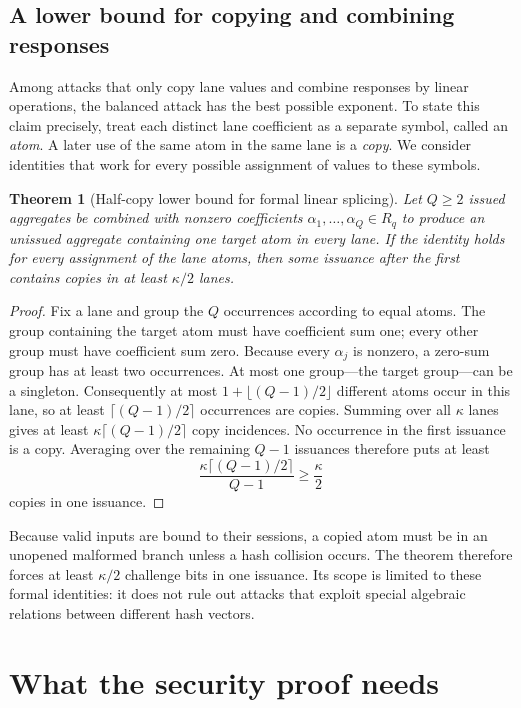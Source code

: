 \documentclass[10pt]{article}
\newtheorem{theorem}{Theorem}
\begin{document}
\subsection{A lower bound for copying and combining responses}

Among attacks that only copy lane values and combine responses by linear
operations, the balanced attack has the best possible exponent.  To state
this claim precisely, treat each distinct lane coefficient as a separate
symbol, called an \emph{atom}.  A later use of the same atom in the same
lane is a \emph{copy}.  We consider identities that work for every possible
assignment of values to these symbols.

\begin{theorem}[Half-copy lower bound for formal linear splicing]
Let $Q\geq2$ issued aggregates be combined with nonzero coefficients
$\alpha_1,\ldots,\alpha_Q\in R_q$ to produce an unissued aggregate containing
one target atom in every lane.  If the identity holds for every assignment of
the lane atoms, then some issuance after the first contains copies in at least
$\kappa/2$ lanes.
\end{theorem}

\begin{proof}
Fix a lane and group the $Q$ occurrences according to equal atoms.  The group
containing the target atom must have coefficient sum one; every other group
must have coefficient sum zero.  Because every $\alpha_j$ is nonzero, a
zero-sum group has at least two occurrences.  At most one group---the target
group---can be a singleton.  Consequently at most
$1+\lfloor(Q-1)/2\rfloor$ different atoms occur in this lane, so at least
$\lceil(Q-1)/2\rceil$ occurrences are copies.  Summing over all $\kappa$ lanes
gives at least $\kappa\lceil(Q-1)/2\rceil$ copy incidences.  No occurrence in
the first issuance is a copy.  Averaging over the remaining $Q-1$ issuances
therefore puts at least
\[
 \frac{\kappa\lceil(Q-1)/2\rceil}{Q-1}\geq\frac\kappa2
\]
copies in one issuance.
\end{proof}

Because valid inputs are bound to their sessions, a copied atom must be in
an unopened malformed branch unless a hash collision occurs.  The theorem
therefore forces at least $\kappa/2$ challenge bits in one issuance.  Its
scope is limited to these formal identities: it does not rule out attacks
that exploit special algebraic relations between different hash vectors.

\section{What the security proof needs}\label{sec:security-targets}
\end{document}
